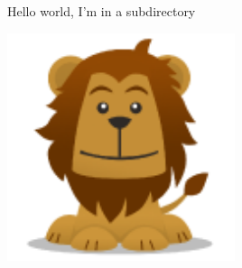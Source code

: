 \documentclass{article}
\begin{document}
Hello world, I'm in a subdirectory \cite{DouglasAdams}




\begin{centering}
\includegraphics[width=0.5\textwidth]{image.png}
\end{centering}



\end{document}
